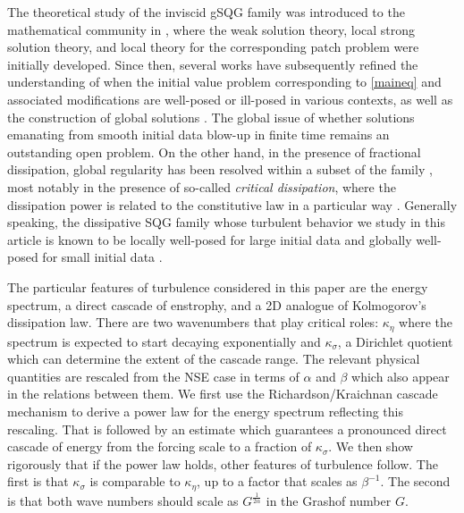 \documentclass[twoside, reqno]{amsart}
\numberwithin{lemma}{section}
\numberwithin{theorem}{section}
\numberwithin{proposition}{section}
\numberwithin{equation}{section} %
\newcommand{\ka}{\kappa}
\begin{document}
The theoretical study of the inviscid gSQG family was introduced to the mathematical community in \cite{ChaeConstantinCordobaGancedoWu2012}, where the weak solution theory, local strong solution theory, and local theory for the corresponding patch problem were initially developed. Since then, several works have subsequently refined the understanding of when the initial value problem corresponding to \eqref{maineq} and associated modifications are well-posed \cite{ChaeWu2012, ChaeConstantinWu2012b, HuKukavicaZiane2015, KiselevYaoZlatos2017, YuZhenJiu2019, GancedoPatel2021, JKM2022, ChaeJeongOh2023b} or ill-posed \cite{KiselevRyzhikYaoZlatos2016, KukavicaVicolWang2016, JeongKim2021, ChaeJeongOh2023b, CordobaLucas-ManchonZoroa-Martinez2025, ChoiJungKim2025} in various contexts, as well as the construction of global solutions \cite{NahmodPavlovicStaffilaniTotz2018, Nguyen2018, CordobaGomez-SerranoIonescu2019, GeldhauserRomito2020, Rosenzweig2020, CaoQinZhanZou2023}. The global issue of whether solutions emanating from smooth initial data blow-up in finite time remains an outstanding open problem. %
On the other hand, in the presence of fractional dissipation, global regularity has been resolved within a subset of the family \cite{Resnick1995, ConstantinWu1999, ConstantinGlattHoltzVicol2013}, most notably in the presence of so-called \textit{critical dissipation}, where the dissipation power is related to the constitutive law in a particular way \cite{KiselevNazarovVolberg2007, KiselevNazarov2009, CaffarelliVasseur2010, ConstantinVicol2012, ConstantinIyerWu2008, LazarXue2019, MiaoXue2012}. Generally speaking, the dissipative SQG family whose turbulent behavior we study in this article is known to be locally well-posed for large initial data and globally well-posed for small initial data \cite{MiaoXue2011, ChaeConstantinWu2012a, JollyKumarMartinez2020a}.

The particular features 
of turbulence
considered in this paper are the energy spectrum, a direct cascade of enstrophy, and a 2D analogue of Kolmogorov's dissipation law.  There are two wavenumbers that play critical roles: $\ka_\eta$ where the spectrum is expected to start decaying exponentially and $\ka_\sigma$, a Dirichlet quotient which can determine the extent of the cascade range.    The relevant physical quantities are rescaled from the NSE case in terms of $\alpha$ and $\beta$ which also appear in the relations between them.  
We first use the Richardson/Kraichnan cascade mechanism to derive a power law for the energy spectrum reflecting this rescaling. That is followed by an estimate which guarantees a pronounced direct cascade of energy from the forcing scale to a fraction of $\ka_\sigma$.  We then show rigorously that if the power law holds, other features of turbulence follow.  The first is that $\ka_\sigma$ is comparable to $\ka_\eta$, up to a factor that scales as $\beta^{-1}$.  The second
is that both wave numbers should scale as
$G^{\frac{1}{2\alpha}}$ in the Grashof number $G$.
\end{document}
